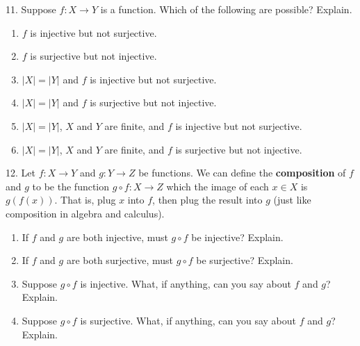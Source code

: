 \documentclass[10pt,]{book}
\newcommand{\terminology}[1]{\textbf{#1}}
\theoremstyle{plain}
\theoremstyle{definition}
\numberwithin{equation}{chapter}
\begin{document}
\begin{exerciselist}
\par\smallskip
\item[11.]\hypertarget{exercise-37}{}
            Suppose \(f:X \to Y\) is a function. Which of the following are possible? Explain.
          \leavevmode%
\begin{enumerate}[label=(\alph*)]
\item\hypertarget{li-168}{}\(f\) is injective but not surjective.%
\item\hypertarget{li-169}{}\(f\) is surjective but not injective.%
\item\hypertarget{li-170}{}\(|X| = |Y|\) and \(f\) is injective but not surjective.%
\item\hypertarget{li-171}{}\(|X| = |Y|\) and \(f\) is surjective but not injective.%
\item\hypertarget{li-172}{}\(|X| = |Y|\), \(X\) and \(Y\) are finite, and \(f\) is injective but not surjective.%
\item\hypertarget{li-173}{}\(|X| = |Y|\), \(X\) and \(Y\) are finite, and \(f\) is surjective but not injective.%
\end{enumerate}

\par\smallskip
\item[12.]\hypertarget{exercise-38}{}
            Let \(f:X \to Y\) and \(g:Y \to Z\) be functions.  We can define the \terminology{composition} of \(f\) and \(g\) to be the function \(g\circ f:X \to Z\) which the image of each \(x \in X\) is \(g(f(x))\).  That is, plug \(x\) into \(f\), then plug the result into \(g\) (just like composition in algebra and calculus).
\par

            \leavevmode%
\begin{enumerate}[label=(\alph*)]
\item\hypertarget{li-174}{}If \(f\) and \(g\) are both injective, must \(g\circ f\) be injective?  Explain.%
\item\hypertarget{li-175}{}If \(f\) and \(g\) are both surjective, must \(g\circ f\) be surjective?  Explain.%
\item\hypertarget{li-176}{}Suppose \(g\circ f\) is injective.  What, if anything, can you say about \(f\) and \(g\)?  Explain.%
\item\hypertarget{li-177}{}Suppose \(g\circ f\) is surjective.  What, if anything, can you say about \(f\) and \(g\)?  Explain.%
\end{enumerate}


\end{exerciselist}
\end{document}
